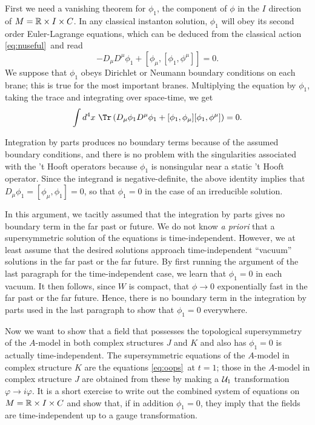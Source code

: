 First we need a vanishing theorem for $\phi_1$, the component of
$\phi$ in the $I$ direction of $M=\Bbb{R}\times I\times C$. In any
classical instanton solution, $\phi_1$ will obey its second order
Euler-Lagrange equations, which can be deduced from the classical
action \eqref{eq:nuseful}\ and read %
\begin{equation*}
\tag*{(9.3)}
-D_\mu
D^\mu\phi_1+[\phi_\mu,[\phi_1,\phi^\mu]]=0.
\end{equation*}
 We suppose that
$\phi_1$ obeys Dirichlet or Neumann boundary conditions on each
brane; this is true for the most important branes.
 Multiplying  the equation by
$\phi_1$, taking the trace and integrating over space-time, we get
\setcounter{equation}{3}
\begin{equation}\label{eq:wungo}
\int d^4x\ \Tr\left( D_\mu\phi_1
D^\mu\phi_1+[\phi_1,\phi_\mu][\phi_1,\phi^\mu]\right)=0.
\end{equation}

Integration by parts produces no boundary terms because of the
assumed boundary conditions, and there is no problem with the
singularities associated with the 't Hooft operators because
$\phi_1$ is nonsingular near a static 't Hooft operator. Since the
integrand is negative-definite, the above identity implies that
$D_\mu\phi_1=[\phi_\mu,\phi_1]=0$, so that $\phi_1=0$ in the case
of an irreducible solution.

In this argument, we tacitly assumed that the integration by parts gives no
boundary term in the far past or future.  We do not know {\it a priori} that a supersymmetric
solution of the equations is time-independent.  However,
we at least assume that the desired solutions approach time-independent ``vacuum'' solutions in the
far past or the far future.  By first running the argument of the last paragraph for the
time-independent case, we learn that $\phi_1=0$ in each vacuum.  It then follows, since $W$ is
compact, that $\phi\to 0$ exponentially fast in the far past or the far future.  Hence, there is
no boundary term in the integration by parts used in the last paragraph to show that $\phi_1=0$
everywhere.

Now we want to show that a field that possesses the topological
supersymmetry of the $A$-model in both complex structures $J$ and
$K$ and also has $\phi_1=0$ is actually time-independent. The
supersymmetric equations of the $A$-model in complex structure $K$
are the equations \eqref{eq:oops}\ at $t=1$; those in the $A$-model in
complex structure $J$ are obtained from these by making a ${\cal
U}_1$ transformation $\varphi\to i\varphi$.  It is a short
exercise to write out the combined system of equations on
$M=\Bbb{R}\times I\times C$ and show that, if in addition
$\phi_1=0$, they imply that the fields are time-independent up to
a gauge transformation.

